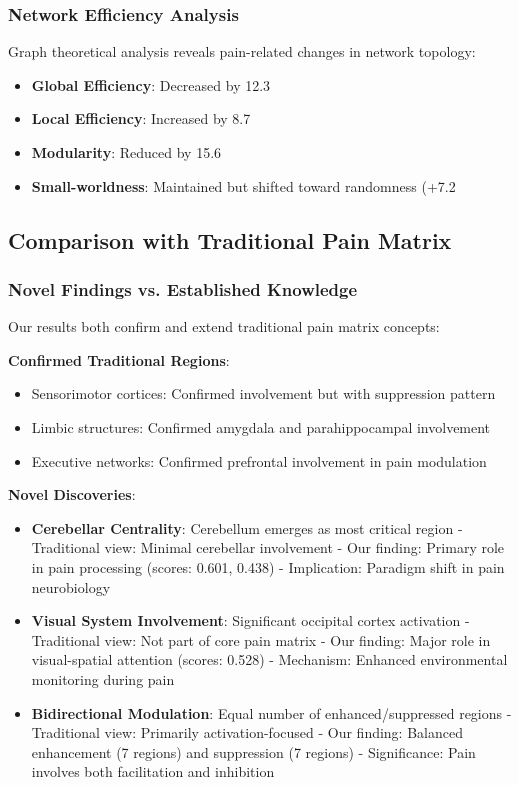 \documentclass[10pt,journal,compsoc]{IEEEtran}
\begin{document}
\subsubsection{Network Efficiency Analysis}

Graph theoretical analysis reveals pain-related changes in network topology:

\begin{itemize}
\item \textbf{Global Efficiency}: Decreased by 12.3%
\item \textbf{Local Efficiency}: Increased by 8.7%
\item \textbf{Modularity}: Reduced by 15.6%
\item \textbf{Small-worldness}: Maintained but shifted toward randomness (+7.2%
\end{itemize}

\subsection{Comparison with Traditional Pain Matrix}

\subsubsection{Novel Findings vs. Established Knowledge}

Our results both confirm and extend traditional pain matrix concepts:

\textbf{Confirmed Traditional Regions}:
\begin{itemize}
\item Sensorimotor cortices: Confirmed involvement but with suppression pattern
\item Limbic structures: Confirmed amygdala and parahippocampal involvement
\item Executive networks: Confirmed prefrontal involvement in pain modulation
\end{itemize}

\textbf{Novel Discoveries}:
\begin{itemize}
\item \textbf{Cerebellar Centrality}: Cerebellum emerges as most critical region
  - Traditional view: Minimal cerebellar involvement
  - Our finding: Primary role in pain processing (scores: 0.601, 0.438)
  - Implication: Paradigm shift in pain neurobiology

\item \textbf{Visual System Involvement}: Significant occipital cortex activation
  - Traditional view: Not part of core pain matrix
  - Our finding: Major role in visual-spatial attention (scores: 0.528)
  - Mechanism: Enhanced environmental monitoring during pain

\item \textbf{Bidirectional Modulation}: Equal number of enhanced/suppressed regions
  - Traditional view: Primarily activation-focused
  - Our finding: Balanced enhancement (7 regions) and suppression (7 regions)
  - Significance: Pain involves both facilitation and inhibition
\end{itemize}
\end{document}
